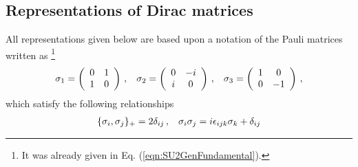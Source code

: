 \begin{comment}
We choose their normalization
\footnote{%
Izykson: $\{ b(\bld{p}),b^\dagger(\bld{p}') \}_+ = \frac{2E}{2m}\delta^3(\bld{p}-\bld{p}')$,
$\bar{u}^r u^s = \delta^{rs}$,\\
\hspace{20mm}$\psi(x) \sim \int d^3\bld{p}\frac{2m}{2E}[ b u e^{-ipx} \dots]$\\
Hioki, Tong: $\{ b(\bld{p}),b^\dagger(\bld{p}') \}_+ = (2\pi)^3 2E\delta^3(\bld{p}-\bld{p}')$,
$\bar{u}^r u^s = 2m \delta^{rs}$,\\
\hspace{20mm}$\psi(x) = \int \frac{d^3\bld{p}}{(2\pi)^32E}[ b u e^{-ipx} \dots]$\\
dim $\psi = E^{3/2}$
}%

\end{comment}



\subsection{Representations of Dirac matrices}
All representations given below are based upon
a notation of the Pauli matrices written as
\footnote{%
It was already given in Eq. (\ref{eqn:SU2GenFundamental}).
}%
\begin{eqnarray}
\sigma_1 =
\left(
\begin{array}{cc}
0 & 1 \\ 1 & 0
\end{array}
\right)\,,
\hspace{3mm}
\sigma_2 =
\left(
\begin{array}{cc}
0 & -i \\ i & 0
\end{array}
\right)\,,
\hspace{3mm}
\sigma_3 =
\left(
\begin{array}{cc}
1 &  0\\ 0 & -1
\end{array}
\right)\,,
\end{eqnarray}
which satisfy the following relationships
\begin{eqnarray}
\{
\sigma_i, \sigma_j \}_+ = 2 \delta_{ij}\,,
\hspace{3mm}
\sigma_i \sigma_j = i\epsilon_{ijk} \sigma_k + \delta_{ij}
\end{eqnarray}

